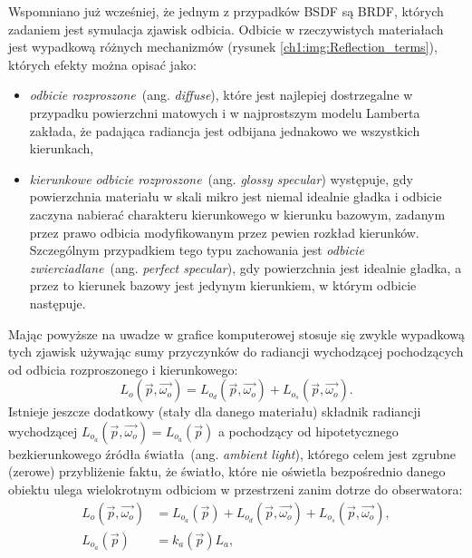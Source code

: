 Wspomniano już wcześniej, że jednym z przypadków BSDF są BRDF, których zadaniem jest symulacja zjawisk odbicia. Odbicie w rzeczywistych materiałach jest wypadkową różnych mechanizmów (rysunek \ref{ch1:img:Reflection_terms}), których efekty można opisać jako:
\begin{itemize}
\item \textit{odbicie rozproszone}~(ang. \textit{diffuse}), które jest najlepiej dostrzegalne w przypadku powierzchni matowych i w najprostszym modelu Lamberta zakłada, że padająca radiancja jest odbijana jednakowo we wszystkich kierunkach,
\item \textit{kierunkowe odbicie rozproszone}~(ang. \textit{glossy specular}) występuje, gdy powierzchnia materiału w skali mikro jest niemal idealnie gładka i odbicie zaczyna nabierać charakteru kierunkowego w kierunku bazowym, zadanym przez prawo odbicia modyfikowanym przez pewien rozkład kierunków. Szczególnym przypadkiem tego typu zachowania jest \textit{odbicie zwierciadlane}~(ang. \textit{perfect specular}), gdy powierzchnia jest idealnie gładka, a przez to kierunek bazowy jest jedynym kierunkiem, w którym odbicie następuje. 
\end{itemize}
Mając powyższe na uwadze w grafice komputerowej stosuje się zwykle wypadkową tych zjawisk używając sumy przyczynków do radiancji wychodzącej pochodzących od odbicia rozproszonego i kierunkowego:
\begin{equation}
L_o(\vec{p}, \vec{\omega_o}) = L_{o_d}(\vec{p}, \vec{\omega_o}) + L_{o_s}(\vec{p}, \vec{\omega_o}).
\end{equation}
Istnieje jeszcze dodatkowy (stały dla danego materiału) składnik radiancji wychodzącej $L_{o_a}(\vec{p}, \vec{\omega_o})=L_{o_a}(\vec{p})$ a pochodzący od hipotetycznego bezkierunkowego źródła światła~(ang. \textit{ambient light}), którego celem jest zgrubne (zerowe) przybliżenie faktu, że światło, które nie oświetla bezpośrednio danego obiektu ulega wielokrotnym odbiciom w przestrzeni zanim dotrze do obserwatora:
\begin{align}
\label{ch1:eq:shading_equation}
L_o(\vec{p}, \vec{\omega_o}) &= L_{o_a}(\vec{p}) + L_{o_d}(\vec{p}, \vec{\omega_o}) + L_{o_s}(\vec{p}, \vec{\omega_o}),\\
L_{o_a}(\vec{p}) &= k_a(\vec{p})L_a,
\end{align}
